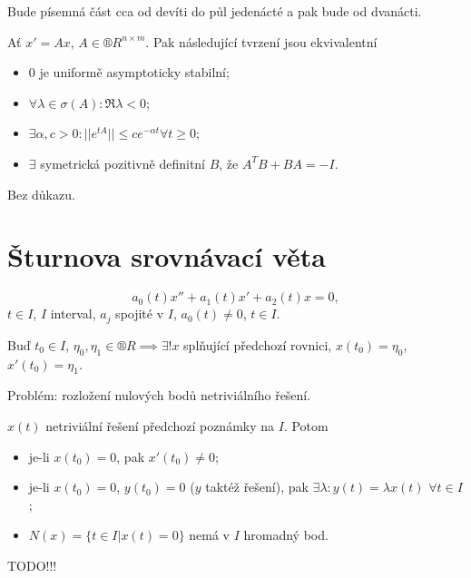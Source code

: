 \documentclass[12pt]{article}					%
\begin{document}
\begin{poznamka}[Zkouška]
	Bude písemná část cca od devíti do půl jedenácté a pak bude od dvanácti.
\end{poznamka}

\begin{veta}
	Ať $x' = Ax$, $A \in ®R^{n \times m}$. Pak následující tvrzení jsou ekvivalentní

	\begin{itemize}
		\item 0 je uniformě asymptoticky stabilní;
		\item $\forall \lambda \in \sigma(A): \Re \lambda < 0$;
		\item $\exists \alpha, c > 0: ||e^{tA}|| ≤ c e^{-\alpha t} \forall t ≥ 0$;
		\item $\exists$ symetrická pozitivně definitní $B$, že $A^TB + BA = -I$.
	\end{itemize}

	\begin{dukazin}
		Bez důkazu.
	\end{dukazin}
\end{veta}


\section{Šturnova srovnávací věta}
\begin{poznamka}
	$$ a_0(t)x'' + a_1(t)x' + a_2(t)x = 0, $$
	$t \in I$, $I$ interval, $a_j$ spojité v $I$, $a_0(t) ≠ 0$, $t \in I$.

	Buď $t_0 \in I$, $\eta_0, \eta_1 \in ®R \implies \exists! x$ splňující předchozí rovnici, $x(t_0) = \eta_0$, $x'(t_0) = \eta_1$.

	Problém: rozložení nulových bodů netriviálního řešení.
\end{poznamka}

\begin{lemma}
	$x(t)$ netriviální řešení předchozí poznámky na $I$. Potom

	\begin{itemize}
		\item je-li $x(t_0) = 0$, pak $x'(t_0) ≠ 0$;
		\item je-li $x(t_0) = 0$, $y(t_0) = 0$ ($y$ taktéž řešení), pak $\exists \lambda: y(t) = \lambda x(t)$ $\forall t \in I$;
		\item $N(x) = \{t \in I | x(t) = 0\}$ nemá v $I$ hromadný bod.
	\end{itemize}

	\begin{dukazin}
		TODO!!!
	\end{dukazin}
\end{lemma}
\end{document}
